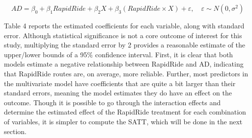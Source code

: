 \documentclass[
  12pt,
]{article}
\begin{document}
\[AD = \beta_0 + \beta_1 RapidRide + \beta_2 X + \beta_3 (RapidRide \times X) + \varepsilon, \quad \varepsilon \sim N(0, \sigma^2)\]

Table 4 reports the estimated coefficients for each variable, along with
standard error. Although statistical significance is not a core outcome
of interest for this study, multiplying the standard error by 2 provides
a reasonable estimate of the upper/lower bounds of a 95\% confidence
interval. First, it is clear that both models estimate a negative
relationship between RapidRide and AD, indicating that RapidRide routes
are, on average, more reliable. Further, most predictors in the
multivariate model have coefficients that are quite a bit larger than
their standard errors, meaning the model estimates they do have an
effect on the outcome. Though it is possible to go through the
interaction effects and determine the estimated effect of the RapidRide
treatment for each combination of variables, it is simpler to compute
the SATT, which will be done in the next section.
\end{document}
